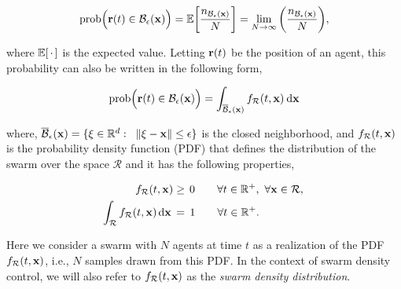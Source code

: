 \documentclass{ifacconf}
\newcommand{\Rconf}{{\mathcal R}}
\newcommand{\bx}{{\bf x}}
\newcommand{\br}{{\bf r}}
\begin{document}
\begin{equation} \label{eqn: ProbDef}
	\textnormal{prob}\Big( \br(t) \in \mathcal{B}_\epsilon(\bx) \Big) = \mathbb{E}\bigg[\frac{{n}_{{\mathcal{B}}_\epsilon(\bx)}}{N}\bigg] = \lim\limits_{N \rightarrow \infty} \bigg(\frac{{n}_{{\mathcal{B}}_\epsilon(\bx)}}{N} \bigg),
\end{equation}

where $\mathbb{E}[\hspace{0.5mm} \cdot \hspace{0.5mm}]$ is the expected value. Letting $\br(t)$ be the position of an agent,  this probability can also be written in the following form,

\begin{equation} \label{eqn: ProbDens}
	\textnormal{prob}\Big( \br(t) \in \mathcal{B}_\epsilon(\bx) \Big) = \int_{\overline{\mathcal{B}}_\epsilon(\bx)} f_\Rconf(t,\bx) \hspace{0.75mm} \textnormal{d}\bx
\end{equation}

where, $\overline{\mathcal{B}}_\epsilon(\bx) = \{\xi \in \mathbb{R}^d : \hspace{2mm} \| \xi - \bx\| \leq \epsilon \}$ is the closed neighborhood, and  $f_\Rconf(t,\bx)$ is the probability density function (PDF) that defines the distribution of the swarm over the space $\Rconf$ and it has the following properties,

\begin{subequations} \label{eqn: probProp}
	\begin{align}
	f_\Rconf (t,\bx) &\geq \hspace{0.5mm} 0 \qquad \forall t \in \mathbb{R}^+, \ \forall \bx \in \Rconf, \\
	\hspace{-0.6mm}\int_{\Rconf} f_\Rconf (t,\bx) \hspace{0.5mm} \textnormal{d}\bx \hspace{0.6mm} &= \hspace{0.6mm} 1 \qquad \forall t \in \mathbb{R}^+.
	\end{align}
\end{subequations}

Here we consider a swarm with $N$ agents at time $t$ as a realization of the PDF $f_\Rconf (t,\bx)$, i.e., $N$ samples drawn from this PDF.   In the context of swarm density control, we will also refer to  $f_\Rconf (t,\bx)$ as the \emph{swarm density distribution}.
\end{document}
